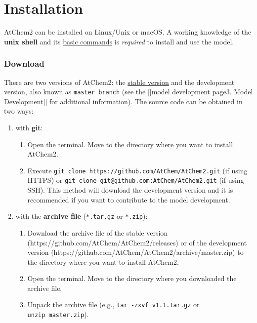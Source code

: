 \chapter{Installation}

AtChem2 can be installed on Linux/Unix or macOS. A working knowledge of
the \textbf{unix shell} and its
\href{https://swcarpentry.github.io/shell-novice/reference/}{basic
commands} is \emph{required} to install and use the model.

\hypertarget{download}{%
\subsection{Download}\label{download}}

There are two versions of AtChem2: the
\href{https://github.com/AtChem/AtChem2/releases}{stable version} and
the development version, also known as \texttt{master\ branch} (see the
{[}{[}model development page\textbar{}3. Model Development{]}{]} for
additional information). The source code can be obtained in two ways:

\begin{enumerate}
\def\labelenumi{\arabic{enumi}.}
\tightlist
\item
  with \textbf{git}:

  \begin{enumerate}
  \def\labelenumii{\arabic{enumii}.}
  \tightlist
  \item
    Open the terminal. Move to the directory where you want to install
    AtChem2.
  \item
    Execute \texttt{git\ clone\ https://github.com/AtChem/AtChem2.git}
    (if using HTTPS) or
    \texttt{git\ clone\ git@github.com:AtChem/AtChem2.git} (if using
    SSH). This method will download the development version and it is
    recommended if you want to contribute to the model development.
  \end{enumerate}
\item
  with the \textbf{archive file} (\texttt{*.tar.gz} or \texttt{*.zip}):

  \begin{enumerate}
  \def\labelenumii{\arabic{enumii}.}
  \tightlist
  \item
    Download the archive file of the stable version
    (https://github.com/AtChem/AtChem2/releases) or of the development
    version (https://github.com/AtChem/AtChem2/archive/master.zip) to
    the directory where you want to install AtChem2.
  \item
    Open the terminal. Move to the directory where you downloaded the
    archive file.
  \item
    Unpack the archive file (e.g., \texttt{tar\ -zxvf\ v1.1.tar.gz} or
    \texttt{unzip\ master.zip}).
  \end{enumerate}
\end{enumerate}

